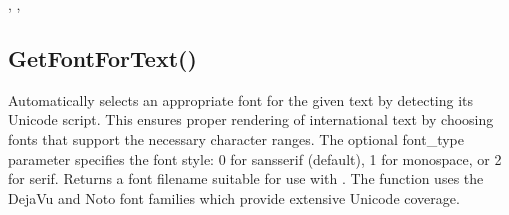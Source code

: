 \documentclass[letterpaper,10pt,english]{sphinxmanual}
\begin{document}
\sphinxAtStartPar
{}

\sphinxAtStartPar
{}, , 

\ignorespaces 

\subsection{GetFontForText()}
\label{\detokenize{reference/peblstring:getfontfortext}}\label{\detokenize{reference/peblstring:index-11}}
\sphinxAtStartPar
{}

\sphinxAtStartPar
{}

\sphinxAtStartPar
Automatically selects an appropriate font for the given text by detecting its Unicode script. This ensures proper rendering of international text by choosing fonts that support the necessary character ranges. The optional font\_type parameter specifies the font style: 0 for sans\sphinxhyphen{}serif (default), 1 for monospace, or 2 for serif. Returns a font filename suitable for use with . The function uses the DejaVu and Noto font families which provide extensive Unicode coverage.

\sphinxAtStartPar
{}

\begin{sphinxVerbatim}[commandchars=\\\{\}]
\end{sphinxVerbatim}

\sphinxAtStartPar
{}
\end{document}
